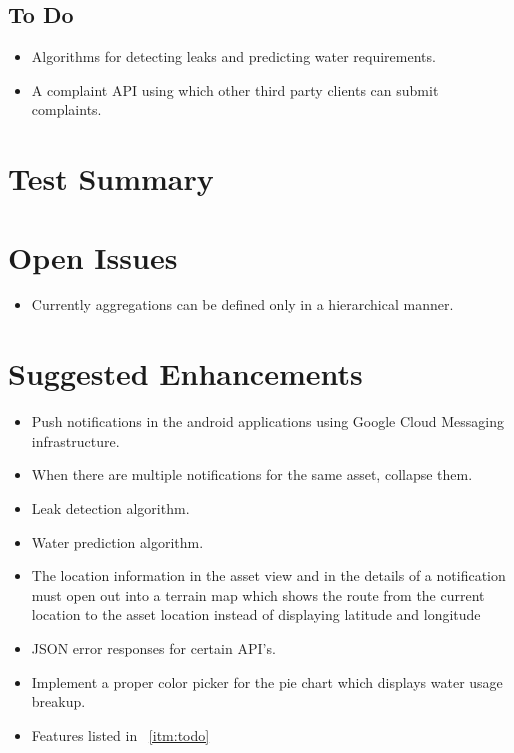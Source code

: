 \documentclass[11pt]{report} %
\begin{document}
\section{To Do}
\begin{itemize}
\item Algorithms for detecting leaks and predicting water requirements.
\item A complaint API using which other third party clients can submit complaints.
\end{itemize}


\chapter{Test Summary}


\chapter{Open Issues}
\begin{itemize}
\item Currently aggregations can be defined only in a hierarchical manner.
\end{itemize}


\chapter{Suggested Enhancements}
\begin{itemize}
\item Push notifications in the android applications using Google Cloud Messaging infrastructure.
\item When there are multiple notifications for the same asset, collapse them.
\item Leak detection algorithm.
\item Water prediction algorithm.
\item The location information in the asset view and in the details of a notification must open out into a terrain map which shows the route from the current location to the asset location instead of displaying latitude and longitude
\item JSON error responses for certain API's.
\item Implement a proper color picker for the pie chart which displays water usage breakup.
\item Features listed in ~\ref{itm:todo}
\end{itemize}
\end{document}

